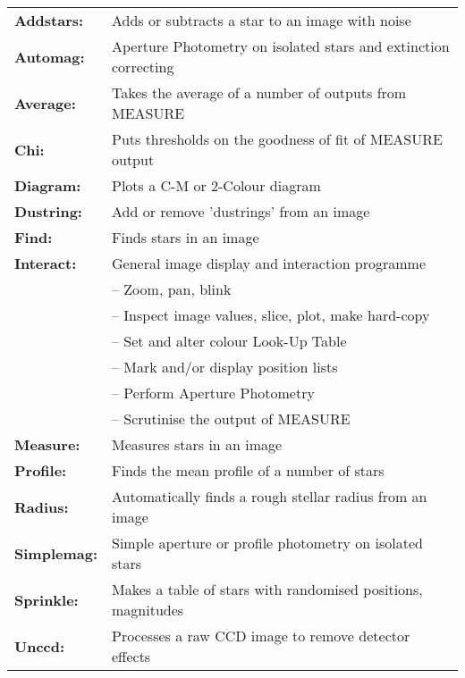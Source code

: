 \label{ap:summary}
\begin{tabular}{ll}
{\bf  Addstars:} &	Adds or subtracts a star to an image with noise \\
{\bf  Automag:} &	Aperture Photometry on isolated stars and extinction correcting \\
{\bf  Average:} &	Takes the average of a number of outputs from MEASURE \\
{\bf  Chi:} &		Puts thresholds on the goodness of fit of MEASURE output \\
{\bf  Diagram:} &	Plots a C-M or 2-Colour diagram \\
{\bf  Dustring:} &      Add or remove 'dustrings' from an image \\
{\bf  Find:} &		Finds stars in an image \\
{\bf  Interact:} &      General image display and interaction programme \\
                 &      \hspace{2ex} -- Zoom, pan, blink\\
                 &      \hspace{2ex} -- Inspect image values, slice, plot,  make hard-copy\\
                 &      \hspace{2ex} -- Set and alter colour Look-Up Table \\
                 &      \hspace{2ex} -- Mark and/or display position lists \\
                 &      \hspace{2ex} -- Perform Aperture Photometry \\
                 &      \hspace{2ex} -- Scrutinise the output of MEASURE \\
{\bf  Measure:} &	Measures stars in an image \\
{\bf  Profile:} &	Finds the mean profile of a number of stars \\
{\bf  Radius:} &        Automatically finds a rough stellar radius from an image \\
{\bf  Simplemag:} &	Simple aperture or profile photometry on isolated stars \\
{\bf  Sprinkle:} &      Makes a table of stars with randomised positions, magnitudes \\
{\bf  Unccd:} &         Processes a raw CCD image to remove detector effects \\
\end{tabular}

